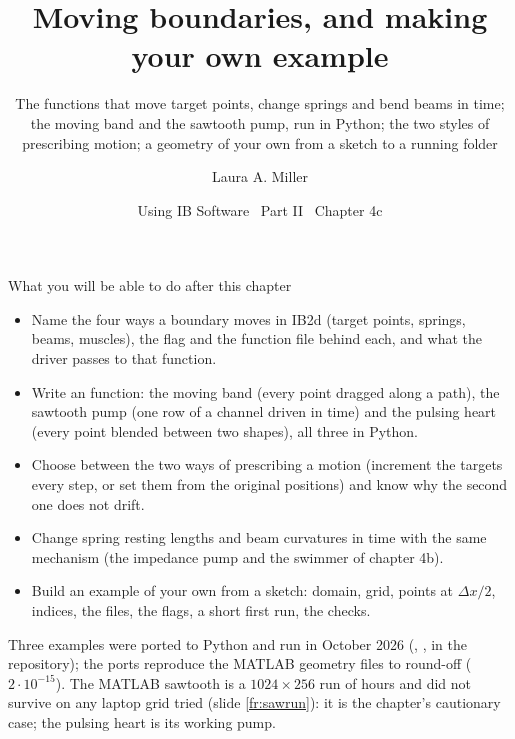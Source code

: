 \documentclass[aspectratio=169,11pt]{beamer}
\title[IB2d: moving boundaries, your own example]{Moving boundaries, and making your own example}
\subtitle{The \code{update\_*} functions that move target points, change springs and bend beams in time; the moving band and the sawtooth pump, run in Python; the two styles of prescribing motion; a geometry of your own from a sketch to a running folder}
\author[Miller]{Laura A. Miller}
\institute[UArizona]{Department of Mathematics, University of Arizona}
\date{Using IB Software \textbullet\ Part II \textbullet\ Chapter 4c}
\begin{document}
\begin{frame}[plain]
\end{frame}

\begin{frame}{What you will be able to do after this chapter}
\label{fr:goals}
\footnotesize
\begin{itemize}
  \item Name the four ways a boundary moves in IB2d (target points, springs, beams, muscles), the  flag and the function file behind each, and what the driver passes to that function.
  \item Write an  function: the moving band (every point dragged along a path), the sawtooth pump (one row of a channel driven in time) and the pulsing heart (every point blended between two shapes), all three in Python.
  \item Choose between the two ways of prescribing a motion (increment the targets every step, or set them from the original positions) and know why the second one does not drift.
  \item Change spring resting lengths and beam curvatures in time with the same mechanism (the impedance pump and the swimmer of chapter 4b).
  \item Build an example of your own from a sketch: domain, grid, points at $\Delta x/2$, indices, the files, the flags, a short first run, the checks.
\end{itemize}
\begin{punchbox}
\small Three examples were ported to Python and run in October 2026 (, ,  in the repository); the ports reproduce the MATLAB geometry files to round-off ($2 \cdot 10^{-15}$). The MATLAB sawtooth is a $1024 \times 256$ run of hours and did not survive on any laptop grid tried (slide \ref{fr:sawrun}): it is the chapter's cautionary case; the pulsing heart is its working pump.
\end{punchbox}
\end{frame}
\end{document}
